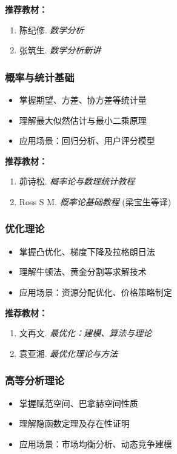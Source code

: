 \documentclass[lang=cn,12pt,a4paper]{elegantpaper}
\begin{document}
\noindent \textbf{推荐教材：}
\begin{enumerate}[leftmargin=*,nosep]
    \item 陈纪修. \textit{数学分析}
    \item 张筑生. \textit{数学分析新讲}
\end{enumerate}

\subsubsection{概率与统计基础}
\begin{itemize}[leftmargin=*,noitemsep]
    \item 掌握期望、方差、协方差等统计量
    \item 理解最大似然估计与最小二乘原理
    \item 应用场景：回归分析、用户评分模型
\end{itemize}

\noindent \textbf{推荐教材：}
\begin{enumerate}[leftmargin=*,nosep]
    \item 茆诗松. \textit{概率论与数理统计教程}
    \item Ross S M. \textit{概率论基础教程} (梁宝生等译)
\end{enumerate}

\subsubsection{优化理论}
\begin{itemize}[leftmargin=*,noitemsep]
    \item 掌握凸优化、梯度下降及拉格朗日法
    \item 理解牛顿法、黄金分割等求解技术
    \item 应用场景：资源分配优化、价格策略制定
\end{itemize}

\noindent \textbf{推荐教材：}
\begin{enumerate}[leftmargin=*,nosep]
    \item 文再文. \textit{最优化：建模、算法与理论}
    \item 袁亚湘. \textit{最优化理论与方法}
\end{enumerate}

\subsubsection{高等分析理论}
\begin{itemize}[leftmargin=*,noitemsep]
    \item 掌握赋范空间、巴拿赫空间性质
    \item 理解隐函数定理及存在性证明
    \item 应用场景：市场均衡分析、动态竞争建模
\end{itemize}
\end{document}
